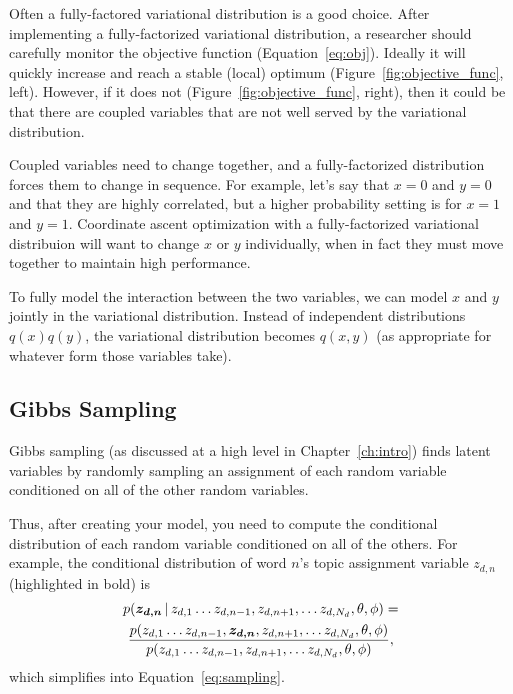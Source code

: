 Often a fully-factored variational distribution is a good choice.
After implementing a fully-factorized variational distribution, a
researcher should carefully monitor the objective function
(Equation~\ref{eq:obj}).  Ideally it will quickly increase and reach a
stable (local) optimum (Figure~\ref{fig:objective_func}, left).
However, if it does not (Figure~\ref{fig:objective_func}, right), then
it could be that there are coupled variables that are not well served
by the variational distribution.

Coupled variables need to change together, and a fully-factorized
distribution forces them to change in sequence.  For example, let's
say that $x=0$ and $y=0$ and that they are highly correlated, but a
higher probability setting is for $x=1$ and $y=1$.  Coordinate ascent
optimization with a fully-factorized variational distribuion will want to change $x$ or $y$
individually, when in fact they must move together to maintain high performance.

To fully model the interaction between the two variables, we can model
$x$ and $y$ jointly in the variational distribution.  Instead of
independent distributions $q(x)q(y)$, the variational distribution
becomes $q(x,y)$ (as appropriate for whatever form those variables take).

\subsection{Gibbs Sampling}

Gibbs sampling (as discussed at a high level in Chapter~\ref{ch:intro}) finds
latent variables by randomly sampling an assignment of each random
variable conditioned on all of the other random variables.

Thus, after creating your model, you need to compute the conditional
distribution of each random variable conditioned on all of the
others.  For example, the conditional distribution of word $n$'s topic
assignment variable $z_{d,n}$ (highlighted in bold) is
\begin{multline}
p(\bm{z_{d,n}} \, | \, z_{d, 1} \dots z_{d, n-1}, z_{d, n+1}, \dots z_{d, N_d},
\theta, \phi) = \\
\frac{p(z_{d, 1} \dots z_{d, n-1}, \bm{z_{d, n}}, z_{d, n+1}, \dots z_{d, N_d}, \theta, \phi)}{ p(z_{d, 1} \dots z_{d, n-1}, z_{d, n+1}, \dots z_{d, N_d},
\theta, \phi)},
\label{eq:gibbs_conditional}
\end{multline}
which simplifies into Equation~\ref{eq:sampling}.

